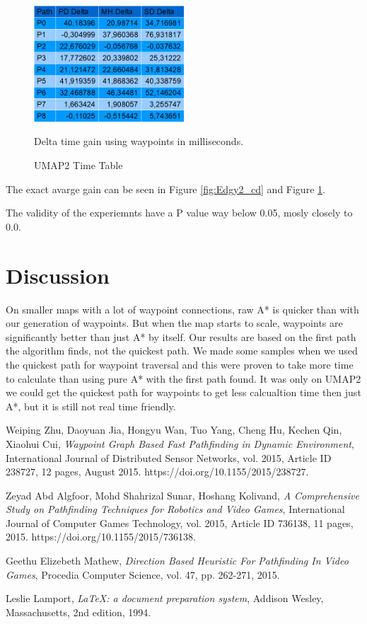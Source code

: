 \documentclass[a4paper]{article}
\begin{document}
\begin{figure}[h!]
\centering
\includegraphics[width=0.5\textwidth,height=\textheight,keepaspectratio]{ChartsAndFigures/UMAP2_timeTable.png}
\caption{UMAP2 Time Table}
Delta time gain using waypoints in milliseconds.
\label{fig:UMAP2_cd}
\end{figure}

The exact avarge gain can be seen in Figure \ref{fig:Edgy2_cd} and Figure \ref{fig:UMAP2_cd}.
	
The validity of the experiemnts have a P value way below 0.05, mosly closely to 0.0.

\section{Discussion}
On smaller maps with a lot of waypoint connections, raw A* is quicker than with our generation of waypoints. But when the map starts to scale, waypoints are significantly better than just A* by itself.
Our results are based on the first path the algorithm finds, not the quickest path. We made some samples when we used the quickest path for waypoint traversal and this were proven to take more time to calculate than using pure A* with the first path found.
It was only on UMAP2 we could get the quickest path for waypoints to get less calcualtion time then just A*, but it is still not real time friendly.

\newpage
\begin{thebibliography}{9}

  Weiping Zhu, Daoyuan Jia, Hongyu Wan, Tuo Yang, Cheng Hu, Kechen Qin, Xiaohui Cui,
  \textit{Waypoint Graph Based Fast Pathfinding in Dynamic Environment},
  International Journal of Distributed Sensor Networks, vol. 2015, Article ID 238727, 12 pages,
  August 2015. https://doi.org/10.1155/2015/238727.

  Zeyad Abd Algfoor, Mohd Shahrizal Sunar, Hoshang Kolivand,
  \textit{A Comprehensive Study on Pathfinding Techniques for Robotics and Video Games},
  International Journal of Computer Games Technology, vol. 2015, Article ID 736138, 11 pages,
  2015. https://doi.org/10.1155/2015/736138.

  Geethu Elizebeth Mathew,
  \textit{Direction Based Heuristic For Pathfinding In Video Games},
  Procedia Computer Science, vol. 47, pp. 262-271,
  2015.

  Leslie Lamport,
  \textit{\LaTeX: a document preparation system},
  Addison Wesley, Massachusetts,
  2nd edition,
  1994.

\end{thebibliography}
\end{document}
